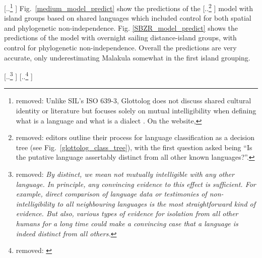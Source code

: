 \documentclass[unnumsec,webpdf,modern,medium]{oup-authoring-template}
\providecommand{\DIFaddtex}[1]{{\protect\color{blue} \sf #1}} %
\providecommand{\DIFdeltex}[1]{{\protect\color{red} [..\footnote{removed: #1} ]}} %
\providecommand{\DIFaddbegin}{} %
\providecommand{\DIFaddend}{} %
\providecommand{\DIFdelbegin}{} %
\providecommand{\DIFdelend}{} %
\providecommand{\DIFadd}[1]{\texorpdfstring{\DIFaddtex{#1}}{#1}} %
\providecommand{\DIFdel}[1]{\texorpdfstring{\DIFdeltex{#1}}{}} %
\newcommand{\DIFscaledelfig}{0.5}
\newlength{\DIFdelgraphicswidth} %
\newlength{\DIFdelgraphicsheight} %
\newcommand{\DIFaddincludegraphics}[2][]{{\color{blue}\fbox{\DIFOincludegraphics[#1]{#2}}}} %
\newcommand{\DIFdelincludegraphics}[2][]{%
\sbox{\DIFdelgraphicsbox}{\DIFOincludegraphics[#1]{#2}}%
\settoboxwidth{\DIFdelgraphicswidth}{\DIFdelgraphicsbox} %
\settoboxtotalheight{\DIFdelgraphicsheight}{\DIFdelgraphicsbox} %
\scalebox{\DIFscaledelfig}{%
\parbox[b]{\DIFdelgraphicswidth}{\usebox{\DIFdelgraphicsbox}\\[-\baselineskip] \rule{\DIFdelgraphicswidth}{0em}}\llap{\resizebox{\DIFdelgraphicswidth}{\DIFdelgraphicsheight}{%
\setlength{\unitlength}{\DIFdelgraphicswidth}%
\begin{picture}(1,1)%
\thicklines\linethickness{2pt} %
{\color[rgb]{1,0,0}\put(0,0){\framebox(1,1){}}}%
{\color[rgb]{1,0,0}\put(0,0){\line( 1,1){1}}}%
{\color[rgb]{1,0,0}\put(0,1){\line(1,-1){1}}}%
\end{picture}%
}\hspace*{3pt}}} %
} %
\DeclareRobustCommand{\DIFaddbegin}{\DIFOaddbegin \let\includegraphics\DIFaddincludegraphics} %
\DeclareRobustCommand{\DIFaddend}{\DIFOaddend \let\includegraphics\DIFOincludegraphics} %
\DeclareRobustCommand{\DIFdelbegin}{\DIFOdelbegin \let\includegraphics\DIFdelincludegraphics} %
\DeclareRobustCommand{\DIFdelend}{\DIFOaddend \let\includegraphics\DIFOincludegraphics} %
\begin{document}
\DIFdel{Unlike SIL's ISO 639-3, Glottolog does not discuss shared cultural identity or literature but focuses solely on mutual intelligibility when defining what is a language and what is a dialect \citep{glottologlanguoids}. On the website, }\DIFdelend \DIFaddbegin \DIFadd{Fig.~\ref{medium_model_predict} show the predictions of }\DIFaddend the \DIFdelbegin \DIFdel{editors outline their process for language classification as a decision tree (see Fig.~\ref{glottolog_class_tree}), with the first question asked being ``Is the putative language assertably distinct from all other known languages?''.
}\DIFdelend \DIFaddbegin \DIFadd{model with island groups based on shared languages which included control for both spatial and phylogenetic non-independence. Fig. \ref{SBZR_model_predict} shows the predictions of the model with overnight sailing distance-island groups, with control for phylogenetic non-independence. Overall the predictions are very accurate, only underestimating Malakula somewhat in the first island grouping.
}\DIFaddend 

\DIFdelbegin %
\DIFdel{\emph{By distinct, we mean not mutually intelligible with any other language. In principle, any convincing evidence to this effect is sufficient. For example, direct comparison of language data or testimonies of non-intelligibility to all neighbouring languages is the most straightforward kind of evidence. But also, various types of evidence for isolation from all other humans for a long time could make a convincing case that a language is indeed distinct from all others.}
}%
\DIFdel{\citep{glottologlanguoids}}%
\DIFdelend %
\end{document}

